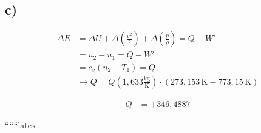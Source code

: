 

\subsection*{c)}

\begin{align*}
\Delta E &= \Delta U + \Delta \left( \frac{v^2}{2} \right) + \Delta \left( \frac{p}{\rho} \right) = Q - W' \\
&= u_2 - u_1 = Q - W' \\
&= c_v \left( u_2 - T_1 \right) = Q \\
&\rightarrow Q = Q \left( 1,633 \frac{\text{kg}}{\text{K}} \right) \cdot \left( 273,153 \, \text{K} - 773,15 \, \text{K} \right)
\end{align*}

\begin{align*}
Q &= +346,4887
\end{align*}

``````latex